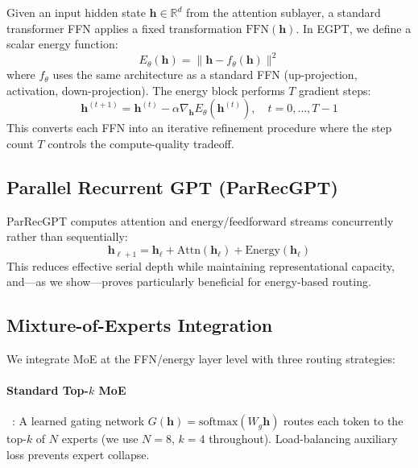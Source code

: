 \documentclass[oneside]{article}
\begin{document}
Given an input hidden state $\mathbf{h} \in \mathbb{R}^d$ from the attention sublayer, a standard transformer FFN applies a fixed transformation $\mathrm{FFN}(\mathbf{h})$. In EGPT, we define a scalar energy function:
\begin{equation}
    E_\theta(\mathbf{h}) = \|\mathbf{h} - f_\theta(\mathbf{h})\|^2
\end{equation}
where $f_\theta$ uses the same architecture as a standard FFN (up-projection, activation, down-projection). The energy block performs $T$ gradient steps:
\begin{equation}
    \mathbf{h}^{(t+1)} = \mathbf{h}^{(t)} - \alpha \nabla_{\mathbf{h}} E_\theta(\mathbf{h}^{(t)}), \quad t = 0, \ldots, T-1
\end{equation}
This converts each FFN into an iterative refinement procedure where the step count $T$ controls the compute-quality tradeoff.

\subsection{Parallel Recurrent GPT (ParRecGPT)}

ParRecGPT computes attention and energy/feedforward streams concurrently rather than sequentially:
\begin{equation}
    \mathbf{h}_{\ell+1} = \mathbf{h}_\ell + \mathrm{Attn}(\mathbf{h}_\ell) + \mathrm{Energy}(\mathbf{h}_\ell)
\end{equation}
This reduces effective serial depth while maintaining representational capacity, and---as we show---proves particularly beneficial for energy-based routing.

\subsection{Mixture-of-Experts Integration}

We integrate MoE at the FFN/energy layer level with three routing strategies:

\paragraph{Standard Top-$k$ MoE}~\citep{shazeer2017outrageously,fedus2022switch}: A learned gating network $G(\mathbf{h}) = \mathrm{softmax}(W_g \mathbf{h})$ routes each token to the top-$k$ of $N$ experts (we use $N=8$, $k=4$ throughout). Load-balancing auxiliary loss prevents expert collapse.
\end{document}
